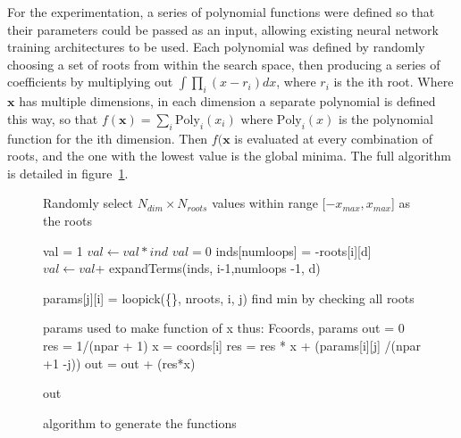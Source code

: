 For the experimentation, a series of polynomial functions were defined so that their parameters could be passed as an input, allowing existing neural network training architectures to be used. Each polynomial was defined by randomly choosing a set of roots from within the search space, then producing a series of coefficients by multiplying out
$\int \prod_i (x - r_i) dx$, where $r_i$ is the ith root. Where $\boldsymbol{x}$ has multiple dimensions, in each dimension a separate polynomial is defined this way, so that $f(\boldsymbol{x})  = \sum_i \text{Poly}_i(x_i)$ where $\text{Poly}_i(x)$ is the polynomial function for the ith dimension. Then $f(\boldsymbol{x}$ is evaluated at every combination of roots, and the one with the lowest value is the global minima. The full algorithm is detailed in figure~\ref{alg:functiongen}.

\begin{figure}
\begin{algorithmic}
\State Randomly select  $N_{dim}\times N_{roots}$ values within range [$-x_{max}, x_{max}$] as the roots

               \State val = 1
                    \State$ val \gets val*ind$
                \EndFor
               \State {}
            \Else
                \State $val = 0$
                    \State inds[numloops] = -roots[i][d]  
                    \State$ val \gets val $+ expandTerms(inds, i-1,numloops -1, d) 
                \EndFor
                \State {}
            \EndIf
      \EndFunction
        
            \State params[j][i] = loopick(\{\}, nroots, i, j)
        \EndFor
    \EndFor
   \State find min by checking all roots
    
  \State params used to make function of x thus:
  \Function F{coords, params}
    \State out = 0
         \State res = 1/(npar + 1)   
        \State x = coords[i]
              \State res = res * x + (params[i][j] /(npar +1 -j))
	    \EndFor
	   \State out =  out + (res*x)
    \EndFor

    \Return out
\EndFunction
\end{algorithmic}
\caption{algorithm to generate the functions}
\label{alg:functiongen}
\end{figure}

